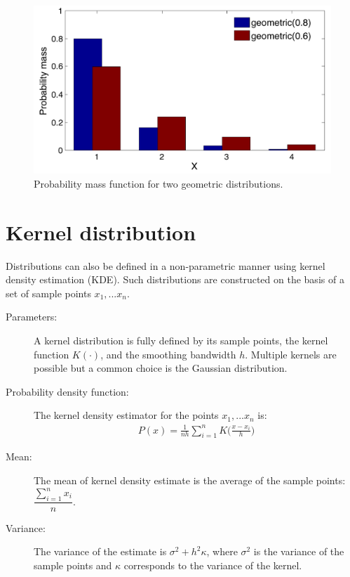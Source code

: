 \begin{figure}[t]
\centering
\includegraphics[scale=0.40]{imgs/geometric_appendix.pdf}  \vspace{-2mm}
\caption{Probability mass function for two geometric distributions. } 
\label{fig:geometric-appendix}
\end{figure}



\section*{Kernel distribution}

Distributions can also be defined in a non-parametric manner using kernel density estimation (KDE).  Such distributions are constructed on the basis of a set of sample points $x_1,...x_n$.

\begin{description}
\item [Parameters: ] A kernel distribution is fully defined by its sample points, the kernel function $K(\cdot)$, and the smoothing bandwidth $h$.  Multiple kernels are possible but a common choice is the Gaussian distribution.

\item [Probability density function: ] The kernel density estimator for the points $x_1,...x_n$ is: 
\begin{align}
P(x) = \frac{1}{nh} \sum_{i=1}^n K\Big(\frac{x-x_i}{h}\Big)
\end{align}
\item [Mean: ] The mean of kernel density estimate is the average of the sample points: $\dfrac{\sum_{i=1}^n x_i}{n}$.

\item [Variance: ] The variance of the estimate is $\sigma^2 + h^2 \kappa$, where $\sigma^2$ is the variance of the sample points and $\kappa$ corresponds to the variance of the kernel. 

\end{description}

